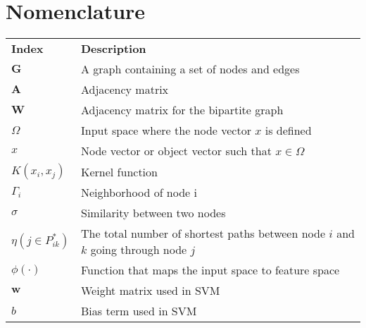 \chapter*{Nomenclature}

{\centering
\begin{longtabu}{X[2cm,l] X[8cm,p,l]}


\\
\textbf{Index} & \textbf{Description}\\
$\textbf{G}$ & A graph containing a set of nodes and edges\\
$\textbf{A}$ & Adjacency matrix\\
$\textbf{W}$ & Adjacency matrix for the bipartite graph\\
$\Omega$ & Input space where the node vector $x$ is defined\\
$x$ & Node vector or object vector such that $x \in \Omega$\\
$K(x_i,x_j)$ & Kernel function\\
$\Gamma_i$ & Neighborhood of node i\\
$\sigma$ & Similarity between two nodes\\
$\eta(j\in P_{ik}^*)$ & The total number of shortest paths between node $i$ and $k$ going through node $j$\\
$\phi(\cdot)$ & Function that maps the input space to feature space\\
$\bm{w}$ & Weight matrix used in SVM\\
$b$ & Bias term used in SVM\\


\end{longtabu}}

